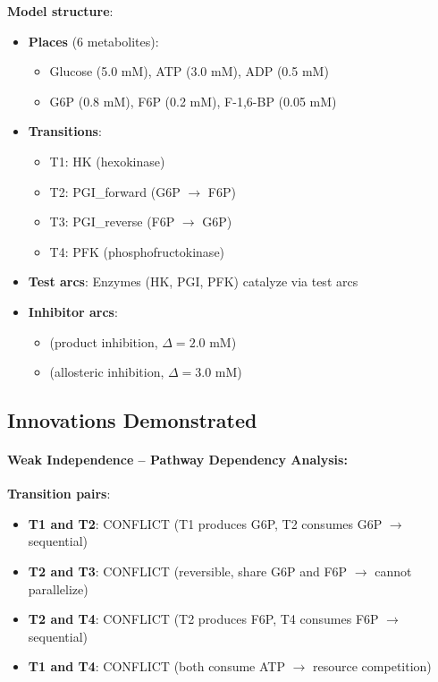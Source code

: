 \textbf{Model structure}:

\begin{itemize}
    \item \textbf{Places} (6 metabolites):
    \begin{itemize}
        \item Glucose (5.0 mM), ATP (3.0 mM), ADP (0.5 mM)
        \item G6P (0.8 mM), F6P (0.2 mM), F-1,6-BP (0.05 mM)
    \end{itemize}
    
    \item \textbf{Transitions}:
    \begin{itemize}
        \item T1: HK (hexokinase)
        \item T2: PGI\_forward (G6P $\to$ F6P)
        \item T3: PGI\_reverse (F6P $\to$ G6P)
        \item T4: PFK (phosphofructokinase)
    \end{itemize}
    
    \item \textbf{Test arcs}: Enzymes (HK, PGI, PFK) catalyze via test arcs
    
    \item \textbf{Inhibitor arcs}:
    \begin{itemize}
        \item {} (product inhibition, $\Delta = 2.0$ mM)
        \item {} (allosteric inhibition, $\Delta = 3.0$ mM)
    \end{itemize}
\end{itemize}

\subsection{Innovations Demonstrated}
\label{subsec:gly-innovations}

\paragraph{Weak Independence -- Pathway Dependency Analysis:}

\textbf{Transition pairs}:
\begin{itemize}
    \item \textbf{T1 and T2}: CONFLICT (T1 produces G6P, T2 consumes G6P $\to$ sequential)
    \item \textbf{T2 and T3}: CONFLICT (reversible, share G6P and F6P $\to$ cannot parallelize)
    \item \textbf{T2 and T4}: CONFLICT (T2 produces F6P, T4 consumes F6P $\to$ sequential)
    \item \textbf{T1 and T4}: CONFLICT (both consume ATP $\to$ resource competition)
\end{itemize}

